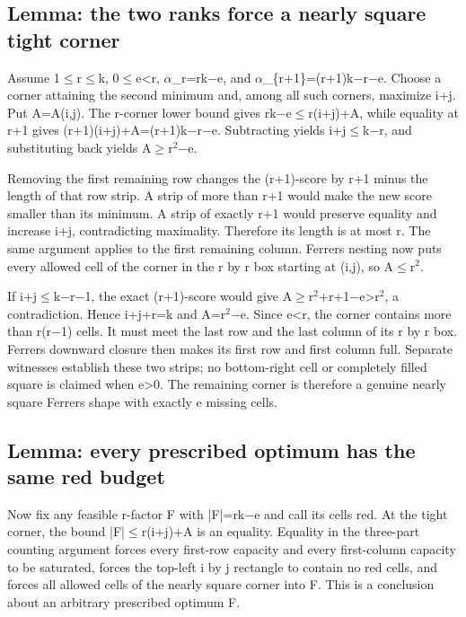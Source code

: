 \documentclass[11pt,a4paper]{article}
\begin{document}
\subsection{Lemma: the two ranks force a nearly square tight corner}
Assume 1\ensuremath{\leq}r\ensuremath{\leq}k, 0\ensuremath{\leq}e<r, \ensuremath{\alpha}\_r=rk\ensuremath{-}e, and \ensuremath{\alpha}\_\{r+1\}=(r+1)k\ensuremath{-}r\ensuremath{-}e. Choose a corner attaining the second minimum and, among all such corners, maximize i+j. Put A=A(i,j). The r-corner lower bound gives rk\ensuremath{-}e\ensuremath{\leq}r(i+j)+A, while equality at r+1 gives (r+1)(i+j)+A=(r+1)k\ensuremath{-}r\ensuremath{-}e. Subtracting yields i+j\ensuremath{\leq}k\ensuremath{-}r, and substituting back yields A\ensuremath{\geq}r\ensuremath{^2}\ensuremath{-}e.

Removing the first remaining row changes the (r+1)-score by r+1 minus the length of that row strip. A strip of more than r+1 would make the new score smaller than its minimum. A strip of exactly r+1 would preserve equality and increase i+j, contradicting maximality. Therefore its length is at most r. The same argument applies to the first remaining column. Ferrers nesting now puts every allowed cell of the corner in the r by r box starting at (i,j), so A\ensuremath{\leq}r\ensuremath{^2}.

If i+j\ensuremath{\leq}k\ensuremath{-}r\ensuremath{-}1, the exact (r+1)-score would give A\ensuremath{\geq}r\ensuremath{^2}+r+1\ensuremath{-}e>r\ensuremath{^2}, a contradiction. Hence i+j+r=k and A=r\ensuremath{^2}\ensuremath{-}e. Since e<r, the corner contains more than r(r\ensuremath{-}1) cells. It must meet the last row and the last column of its r by r box. Ferrers downward closure then makes its first row and first column full. Separate witnesses establish these two strips; no bottom-right cell or completely filled square is claimed when e>0. The remaining corner is therefore a genuine nearly square Ferrers shape with exactly e missing cells.

\subsection{Lemma: every prescribed optimum has the same red budget}
Now fix any feasible r-factor F with |F|=rk\ensuremath{-}e and call its cells red. At the tight corner, the bound |F|\ensuremath{\leq}r(i+j)+A is an equality. Equality in the three-part counting argument forces every first-row capacity and every first-column capacity to be saturated, forces the top-left i by j rectangle to contain no red cells, and forces all allowed cells of the nearly square corner into F. This is a conclusion about an arbitrary prescribed optimum F.
\end{document}

